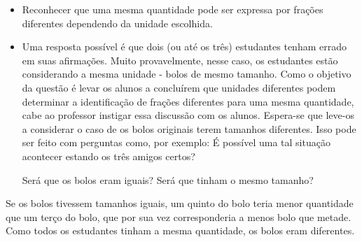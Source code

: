 \begin{atividade}\label{chap2-ativ13}
\objetivos
\begin{itemize} %
    \item Reconhecer que uma mesma quantidade pode ser expressa por frações diferentes dependendo da unidade escolhida.
\end{itemize} %

\discussoes
  \begin{itemize} %
  \item Uma resposta possível é que dois (ou até os três) estudantes tenham errado em suas afirmações.    Muito provavelmente, nesse caso, os estudantes estão considerando a mesma unidade - bolos de mesmo tamanho. 
Como o objetivo da questão é levar os alunos a concluírem que unidades diferentes podem determinar a identificação de frações diferentes para uma mesma quantidade, cabe ao professor instigar essa discussão com os alunos. Espera-se que leve-os a considerar o caso de os bolos originais terem tamanhos diferentes. Isso pode ser feito com perguntas como, por exemplo: É possível uma tal situação acontecer estando os três amigos certos?

Será que os bolos eram iguais? Será que tinham o mesmo tamanho? 
\end{itemize}

\solucao
  Se os bolos tivessem tamanhos iguais, um quinto do bolo teria menor quantidade que um terço do bolo, que por sua vez corresponderia a menos bolo que metade. Como todos os estudantes tinham a mesma quantidade, os bolos eram diferentes.

\end{atividade}

